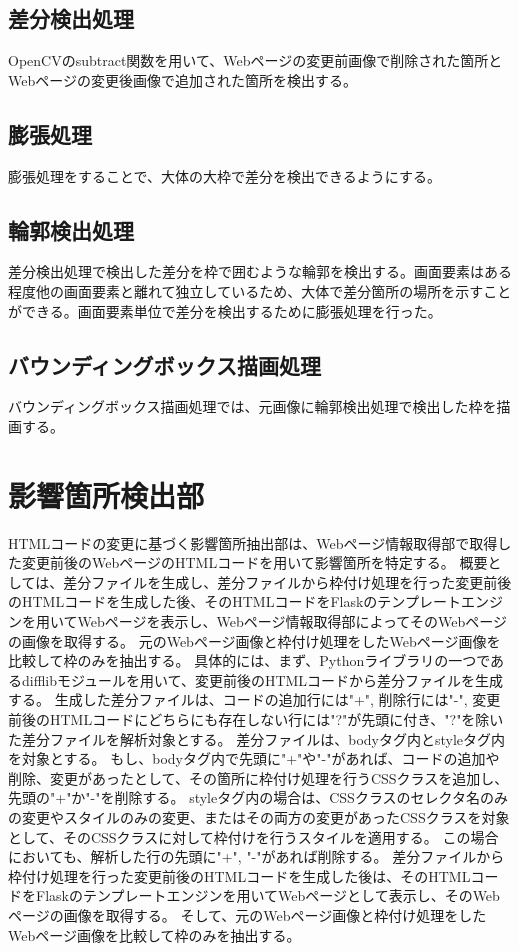 \subsection{差分検出処理}\label{subsec:difference_detection_process}
OpenCVのsubtract関数を用いて、Webページの変更前画像で削除された箇所とWebページの変更後画像で追加された箇所を検出する。

\subsection{膨張処理}\label{subsec:dilation}
膨張処理をすることで、大体の大枠で差分を検出できるようにする。

\subsection{輪郭検出処理}\label{subsec:contour_detection_processing}
差分検出処理で検出した差分を枠で囲むような輪郭を検出する。画面要素はある程度他の画面要素と離れて独立しているため、大体で差分箇所の場所を示すことができる。画面要素単位で差分を検出するために膨張処理を行った。

\subsection{バウンディングボックス描画処理}\label{subsec:Bounding box drawing process}
バウンディングボックス描画処理では、元画像に輪郭検出処理で検出した枠を描画する。


\section{影響箇所検出部}\label{sec:Affected_area_extraction}
HTMLコードの変更に基づく影響箇所抽出部は、Webページ情報取得部で取得した変更前後のWebページのHTMLコードを用いて影響箇所を特定する。
概要としては、差分ファイルを生成し、差分ファイルから枠付け処理を行った変更前後のHTMLコードを生成した後、そのHTMLコードをFlaskのテンプレートエンジンを用いてWebページを表示し、Webページ情報取得部によってそのWebページの画像を取得する。
元のWebページ画像と枠付け処理をしたWebページ画像を比較して枠のみを抽出する。
具体的には、まず、Pythonライブラリの一つであるdifflibモジュールを用いて、変更前後のHTMLコードから差分ファイルを生成する。
生成した差分ファイルは、コードの追加行には"+", 削除行には"-", 変更前後のHTMLコードにどちらにも存在しない行には"?"が先頭に付き、"?"を除いた差分ファイルを解析対象とする。
差分ファイルは、bodyタグ内とstyleタグ内を対象とする。
もし、bodyタグ内で先頭に"+"や"-"があれば、コードの追加や削除、変更があったとして、その箇所に枠付け処理を行うCSSクラスを追加し、先頭の"+"か"-"を削除する。
styleタグ内の場合は、CSSクラスのセレクタ名のみの変更やスタイルのみの変更、またはその両方の変更があったCSSクラスを対象として、そのCSSクラスに対して枠付けを行うスタイルを適用する。
この場合においても、解析した行の先頭に"+", "-"があれば削除する。
差分ファイルから枠付け処理を行った変更前後のHTMLコードを生成した後は、そのHTMLコードをFlaskのテンプレートエンジンを用いてWebページとして表示し、そのWebページの画像を取得する。
そして、元のWebページ画像と枠付け処理をしたWebページ画像を比較して枠のみを抽出する。

